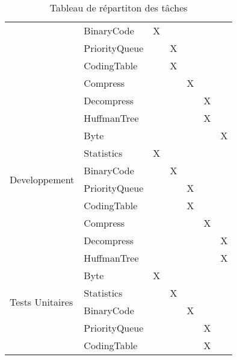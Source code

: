 \documentclass[12pt]{article}
\begin{document}
\begin{table}[]
{\begin{tabular}{|l|l|l|l|l|l|l|}
 & BinaryCode & X &  &  &  &  \\ \cline{2-7} 
 & PriorityQueue &  & X &  &  &  \\ \cline{2-7} 
 & CodingTable &  & X &  &  &  \\ \cline{2-7} 
 & Compress &  &  & X &  &  \\ \cline{2-7} 
 & Decompress &  &  &  & X &  \\ \hline
\multirow{8}{*}{Developpement} & HuffmanTree &  &  &  & X &  \\ \cline{2-7} 
 & Byte &  &  &  &  & X \\ \cline{2-7} 
 & Statistics & X &  &  &  &  \\ \cline{2-7} 
 & BinaryCode &  & X &  &  &  \\ \cline{2-7} 
 & PriorityQueue &  &  & X &  &  \\ \cline{2-7} 
 & CodingTable &  &  & X &  &  \\ \cline{2-7} 
 & Compress &  &  &  & X &  \\ \cline{2-7} 
 & Decompress &  &  &  &  & X \\ \hline
\multirow{8}{*}{Tests Unitaires} & HuffmanTree &  &  &  &  & X \\ \cline{2-7} 
 & Byte & X &  &  &  &  \\ \cline{2-7} 
 & Statistics &  & X &  &  &  \\ \cline{2-7} 
 & BinaryCode &  &  & X &  &  \\ \cline{2-7} 
 & PriorityQueue &  &  &  & X &  \\ \cline{2-7} 
 & CodingTable &  &  &  & X &  \\ \hline
\end{tabular}%
}
\caption{Tableau de répartiton des tâches}
\label{tab:my-table}
\end{table}
\end{document}
